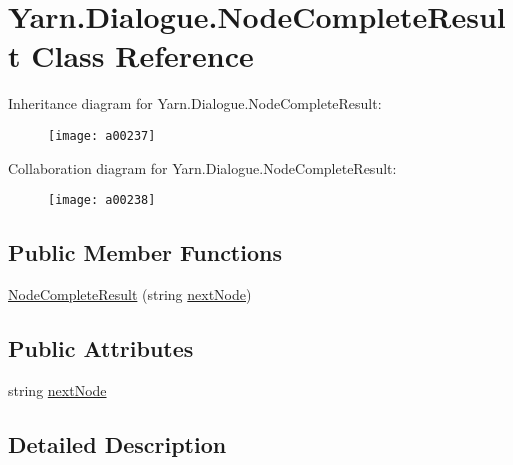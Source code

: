 \hypertarget{a00069}{\section{Yarn.\-Dialogue.\-Node\-Complete\-Result Class Reference}
\label{a00069}
}


Inheritance diagram for Yarn.\-Dialogue.\-Node\-Complete\-Result\-:
\nopagebreak
\begin{figure}[H]
\begin{center}
\leavevmode
\texttt{[image: a00237]}
\end{center}
\end{figure}


Collaboration diagram for Yarn.\-Dialogue.\-Node\-Complete\-Result\-:
\nopagebreak
\begin{figure}[H]
\begin{center}
\leavevmode
\texttt{[image: a00238]}
\end{center}
\end{figure}
\subsection*{Public Member Functions}
\begin{DoxyCompactItemize}
\item 
\hyperlink{a00069_a88c81469a69987c05aa92780c5a5c1f9}{Node\-Complete\-Result} (string \hyperlink{a00069_ad48b37b51066b94cd48c58626ac0e774}{next\-Node})
\end{DoxyCompactItemize}
\subsection*{Public Attributes}
\begin{DoxyCompactItemize}
\item 
string \hyperlink{a00069_ad48b37b51066b94cd48c58626ac0e774}{next\-Node}
\end{DoxyCompactItemize}


\subsection{Detailed Description}


